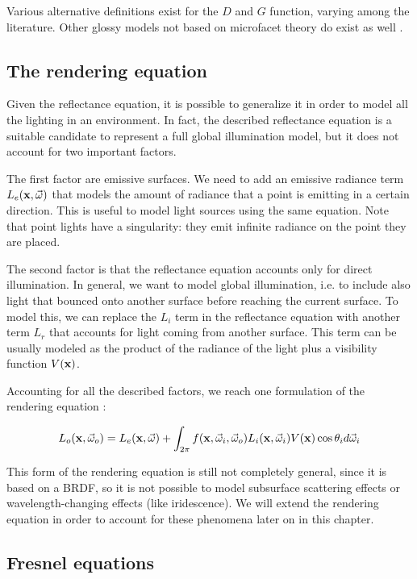Various alternative definitions exist for the $D$ and $G$ function, varying among the literature. Other glossy models not based on microfacet theory do exist as well \citep{montes2012overview}. 

\subsection{The rendering equation}

Given the reflectance equation, it is possible to generalize it in order to model all the lighting in an environment. In fact, the described reflectance equation is a suitable candidate to represent a full global illumination model, but it does not account for two important factors. 

The first factor are emissive surfaces. We need to add an emissive radiance term $L_e(\mathbf{x}, \vec{\omega})$ that models the amount of radiance that a point is emitting in a certain direction. This is useful to model light sources using the same equation. Note that point lights have a singularity: they emit infinite radiance on the point they are placed.

The second factor is that the reflectance equation accounts only for direct illumination. In general, we want to model global illumination, i.e. to include also light that bounced onto another surface before reaching the current surface. To model this, we can replace the $L_i$ term in the reflectance equation with another term $L_r$ that accounts for light coming from another surface. This term can be usually modeled as the product of the radiance of the light plus a visibility function $V(\mathbf{x})$.

Accounting for all the described factors, we reach one formulation of the rendering equation \citep{Kajiya:1986:RE:15886.15902}:

$$
L_o(\mathbf{x}, \vec{\omega}_o) = L_e(\mathbf{x}, \vec{\omega}) + \int_{2\pi} f(\mathbf{x}, \vec{\omega}_i, \vec{\omega}_o) L_i(\mathbf{x}, \vec{\omega}_i) V(\mathbf{x}) \cos\theta_i d\vec{\omega}_i
$$

This form of the rendering equation is still not completely general, since it is based on a BRDF, so it is not possible to model subsurface scattering effects or wavelength-changing effects (like iridescence). We will extend the rendering equation in order to account for these phenomena later on in this chapter.

\subsection{Fresnel equations}
\label{sec:fresnel}


